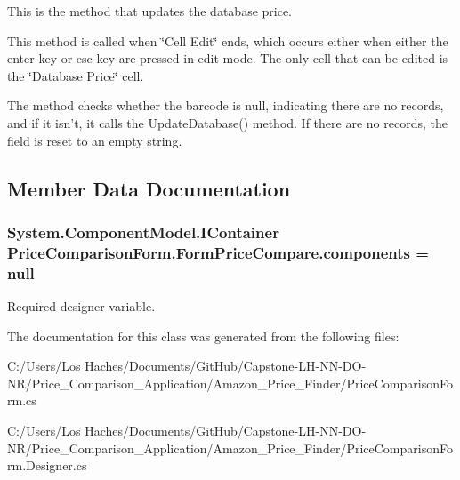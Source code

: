 This is the method that updates the database price. 

This method is called when \char`\"{}\-Cell Edit\char`\"{} ends, which occurs either when either the enter key or esc key are pressed in edit mode. The only cell that can be edited is the \char`\"{}\-Database Price\char`\"{} cell.

The method checks whether the barcode is null, indicating there are no records, and if it isn't, it calls the Update\-Database() method. If there are no records, the field is reset to an empty string. 

\subsection{Member Data Documentation}
\hypertarget{class_price_comparison_form_1_1_form_price_compare_aae6e78edce142e17ecf15f769bd2ba21}{
\subsubsection[{components}]{\setlength{\rightskip}{0pt plus 5cm}System.\-Component\-Model.\-I\-Container Price\-Comparison\-Form.\-Form\-Price\-Compare.\-components = null\hspace{0.3cm}{\ttfamily [private]}}}\label{class_price_comparison_form_1_1_form_price_compare_aae6e78edce142e17ecf15f769bd2ba21}


Required designer variable. 



The documentation for this class was generated from the following files\-:\begin{DoxyCompactItemize}
\item 
C\-:/\-Users/\-Los Haches/\-Documents/\-Git\-Hub/\-Capstone-\/\-L\-H-\/\-N\-N-\/\-D\-O-\/\-N\-R/\-Price\-\_\-\-Comparison\-\_\-\-Application/\-Amazon\-\_\-\-Price\-\_\-\-Finder/Price\-Comparison\-Form.\-cs\item 
C\-:/\-Users/\-Los Haches/\-Documents/\-Git\-Hub/\-Capstone-\/\-L\-H-\/\-N\-N-\/\-D\-O-\/\-N\-R/\-Price\-\_\-\-Comparison\-\_\-\-Application/\-Amazon\-\_\-\-Price\-\_\-\-Finder/Price\-Comparison\-Form.\-Designer.\-cs\end{DoxyCompactItemize}
